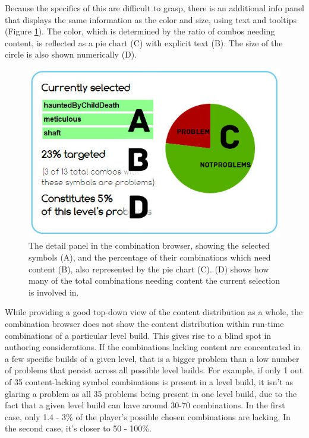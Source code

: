 Because the specifics of this are difficult to grasp, there is an additional info panel that displays the same information as the color and size, using text and tooltips (Figure \ref{fig:viz-detail}). The color, which is determined by the ratio of combos needing content, is reflected as a pie chart (C) with explicit text (B). The size of the circle is also shown numerically (D).


\begin{figure}
    \centering
    \includegraphics[width=\textwidth]{figures/2-Ice-Bound/viz-detail.jpg}
    \caption{The detail panel in the combination browser, showing the selected symbols (A), and the percentage of their combinations which need content (B), also represented by the pie chart (C). (D) shows how many of the total combinations needing content the current selection is involved in.}
    \label{fig:viz-detail}
\end{figure}


While providing a good top-down view of the content distribution as a whole, the combination browser does not show the content distribution within run-time combinations of a particular level build. This gives rise to a blind spot in authoring considerations. If the combinations lacking content are concentrated in a few specific builds of a given level, that is a bigger problem than a low number of problems that persist across all possible level builds. For example, if only 1 out of 35 content-lacking symbol combinations is present in a level build, it isn't as glaring a problem as all 35 problems being present in one level build, due to the fact that a given level build can have around 30-70 combinations. In the first case, only 1.4 - 3\% of the player's possible chosen combinations are lacking. In the second case, it's closer to 50 - 100\%.

